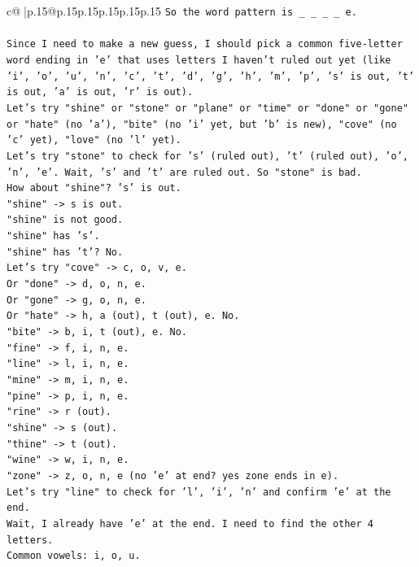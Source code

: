 \documentclass{article}
\begin{document}
{\begin{supertabular}{c@{$\;$}|p{.15\linewidth}@{}p{.15\linewidth}p{.15\linewidth}p{.15\linewidth}p{.15\linewidth}p{.15\linewidth}}
{{{\texttt{So the word pattern is \_ \_ \_ \_ e.} \\
\\ 
\texttt{Since I need to make a new guess, I should pick a common five{-}letter word ending in 'e' that uses letters I haven't ruled out yet (like 'i', 'o', 'u', 'n', 'c', 't', 'd', 'g', 'h', 'm', 'p', 's' is out, 't' is out, 'a' is out, 'r' is out).} \\
\texttt{Let's try "shine" or "stone" or "plane" or "time" or "done" or "gone" or "hate" (no 'a'), "bite" (no 'i' yet, but 'b' is new), "cove" (no 'c' yet), "love" (no 'l' yet).} \\
\texttt{Let's try "stone" to check for 's' (ruled out), 't' (ruled out), 'o', 'n', 'e'. Wait, 's' and 't' are ruled out. So "stone" is bad.} \\
\texttt{How about "shine"? 's' is out.} \\
\texttt{"shine" {-}> s is out.} \\
\texttt{"shine" is not good.} \\
\texttt{"shine" has 's'.} \\
\texttt{"shine" has 't'? No.} \\
\texttt{Let's try "cove" {-}> c, o, v, e.} \\
\texttt{Or "done" {-}> d, o, n, e.} \\
\texttt{Or "gone" {-}> g, o, n, e.} \\
\texttt{Or "hate" {-}> h, a (out), t (out), e. No.} \\
\texttt{"bite" {-}> b, i, t (out), e. No.} \\
\texttt{"fine" {-}> f, i, n, e.} \\
\texttt{"line" {-}> l, i, n, e.} \\
\texttt{"mine" {-}> m, i, n, e.} \\
\texttt{"pine" {-}> p, i, n, e.} \\
\texttt{"rine" {-}> r (out).} \\
\texttt{"shine" {-}> s (out).} \\
\texttt{"thine" {-}> t (out).} \\
\texttt{"wine" {-}> w, i, n, e.} \\
\texttt{"zone" {-}> z, o, n, e (no 'e' at end? yes zone ends in e).} \\
\texttt{Let's try "line" to check for 'l', 'i', 'n' and confirm 'e' at the end.} \\
\texttt{Wait, I already have 'e' at the end. I need to find the other 4 letters.} \\
\texttt{Common vowels: i, o, u.} \\
}}}
\end{supertabular}}
\end{document}
